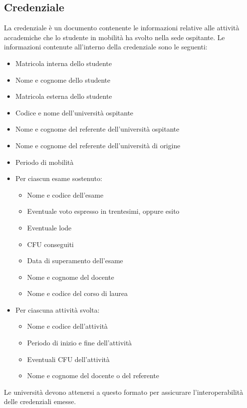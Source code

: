 \documentclass[a4paper,12pt]{article}
\begin{document}
\subsection{Credenziale}
La credenziale è un documento contenente le informazioni relative alle attività accademiche che lo studente in mobilità ha svolto nella sede ospitante. 
\newline Le informazioni contenute all'interno della credenziale sono le seguenti:
\begin{itemize}
    \item Matricola interna dello studente
    \item Nome e cognome dello studente
    \item Matricola esterna dello studente
    \item Codice e nome dell'università ospitante
    \item Nome e cognome del referente dell'università ospitante
    \item Nome e cognome del referente dell'università di origine
    \item Periodo di mobilità
    \item Per ciascun esame sostenuto:
    \begin{itemize}[label=$\circ$]
        \item Nome e codice dell'esame
        \item Eventuale voto espresso in trentesimi, oppure esito
        \item Eventuale lode
        \item CFU conseguiti
        \item Data di superamento dell'esame
        \item Nome e cognome del docente
        \item Nome e codice del corso di laurea
    \end{itemize}
    \item Per ciascuna attività svolta:
    \begin{itemize}[label=$\circ$]
        \item Nome e codice dell'attività
        \item Periodo di inizio e fine dell'attività
        \item Eventuali CFU dell'attività
        \item Nome e cognome del docente o del referente
    \end{itemize}
\end{itemize}
Le università devono attenersi a questo formato per assicurare l'interoperabilità delle credenziali emesse.
\end{document}
